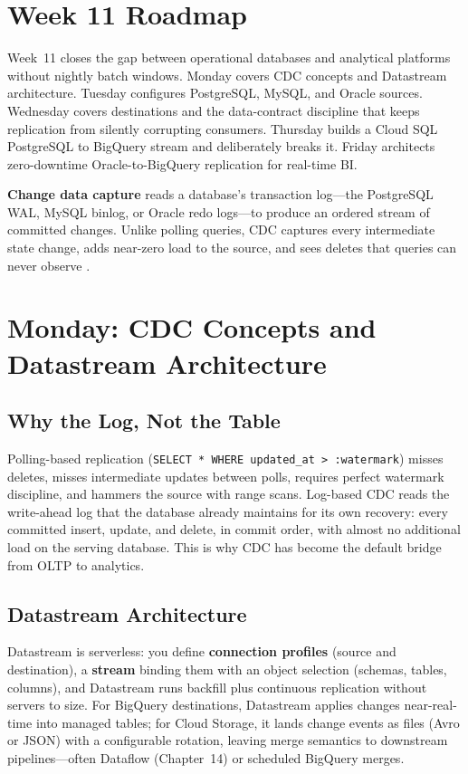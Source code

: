 \section{Week 11 Roadmap}
Week~11 closes the gap between operational databases and analytical platforms without nightly batch windows. Monday covers CDC concepts and Datastream architecture. Tuesday configures PostgreSQL, MySQL, and Oracle sources. Wednesday covers destinations and the data-contract discipline that keeps replication from silently corrupting consumers. Thursday builds a Cloud SQL PostgreSQL to BigQuery stream and deliberately breaks it. Friday architects zero-downtime Oracle-to-BigQuery replication for real-time BI.

\begin{definitionbox}
\textbf{Change data capture} reads a database's transaction log---the PostgreSQL WAL, MySQL binlog, or Oracle redo logs---to produce an ordered stream of committed changes. Unlike polling queries, CDC captures every intermediate state change, adds near-zero load to the source, and sees deletes that queries can never observe \cite{googleclouddatastreamdocs}.
\end{definitionbox}

\section{Monday: CDC Concepts and Datastream Architecture}

\subsection{Why the Log, Not the Table}
Polling-based replication (\texttt{SELECT * WHERE updated\_at > :watermark}) misses deletes, misses intermediate updates between polls, requires perfect watermark discipline, and hammers the source with range scans. Log-based CDC reads the write-ahead log that the database already maintains for its own recovery: every committed insert, update, and delete, in commit order, with almost no additional load on the serving database. This is why CDC has become the default bridge from OLTP to analytics.

\subsection{Datastream Architecture}
Datastream is serverless: you define \textbf{connection profiles} (source and destination), a \textbf{stream} binding them with an object selection (schemas, tables, columns), and Datastream runs backfill plus continuous replication without servers to size. For BigQuery destinations, Datastream applies changes near-real-time into managed tables; for Cloud Storage, it lands change events as files (Avro or JSON) with a configurable rotation, leaving merge semantics to downstream pipelines---often Dataflow (Chapter~14) or scheduled BigQuery merges.


